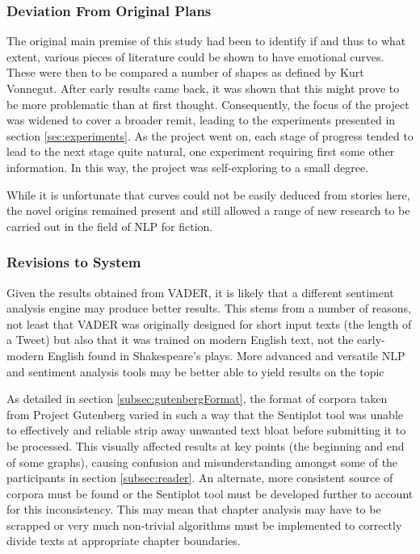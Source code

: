 \documentclass{article}
\begin{document}
{        \subsubsection{Deviation From Original Plans}
            The original main premise of this study had been to identify if and thus to what extent, various pieces of literature could be shown to have emotional curves. These were then to be compared a number of shapes as defined by Kurt Vonnegut. After early results came back, it was shown that this might prove to be more problematic than at first thought. Consequently, the focus of the project was widened to cover a broader remit, leading to the experiments presented in section \ref{sec:experiments}. As the project went on, each stage of progress tended to lead to the next stage quite natural, one experiment requiring first some other information. In this way, the project was self-exploring to a small degree.

            While it is unfortunate that curves could not be easily deduced from stories here, the novel origins remained present and still allowed a range of new research to be carried out in the field of NLP for fiction.
        \subsubsection{Revisions to System}
            Given the results obtained from VADER, it is likely that a different sentiment analysis engine may produce better results. This stems from a number of reasons, not least that VADER was originally designed for short input texts (the length of a Tweet) but also that it was trained on modern English text, not the early-modern English found in Shakespeare's plays. More advanced and versatile NLP and sentiment analysis tools may be better able to yield results on the topic

            As detailed in section \ref{subsec:gutenbergFormat}, the format of corpora taken from Project Gutenberg varied in such a way that the Sentiplot tool was unable to effectively and reliable strip away unwanted text bloat before submitting it to be processed. This visually affected results at key points (the beginning and end of some graphs), causing confusion and misunderstanding amongst some of the participants in section \ref{subsec:reader}. An alternate, more consistent source of corpora must be found or the Sentiplot tool must be developed further to account for this inconsistency. This may mean that chapter analysis may have to be scrapped or very much non-trivial algorithms must be implemented to correctly divide texts at appropriate chapter boundaries.
}
\end{document}
